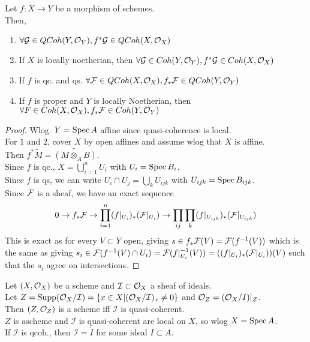 \documentclass[../main.tex]{subfiles}
\begin{document}
\begin{propo}
Let $f:X\to Y$ be a morphism of schemes.\\
Then,
\begin{enumerate}
\item $\forall \mathcal{G} \in QCoh( Y,\mathcal{O}_Y) , f^{\ast }\mathcal{G}\in QCoh( X,\mathcal{O}_X) $ 
\item If $X$ is locally noetherian, then  $\forall \mathcal{G} \in Coh( Y,\mathcal{O}_Y) , f^{\ast }\mathcal{G} \in Coh( X,\mathcal{O}_X) $
\item If $f$ is qc. and qs. $\forall \mathcal{F} \in QCoh( X,\mathcal{O}_X), f_\ast \mathcal{F} \in QCoh( Y,\mathcal{O}_Y) $ 
\item If $f$ is proper and $Y$ is locally Noetherian, then $\forall F\in Coh( X,\mathcal{O}_X), f_\ast \mathcal{F} \in Coh( Y,\mathcal{O}_Y) $ 
\end{enumerate}
\end{propo}
\begin{proof}
Wlog. $Y= \operatorname{Spec} A$ affine since quasi-coherence is local.\\
For 1 and 2, cover $X$ by open affines and assume wlog that $X$ is affine.\\
Then $f^{\ast} \widetilde{M} = \widetilde{( M\otimes_A B)}$.\\
Since $f$ is qc., $X= \bigcup_{i=1}^{n}U_i$ with $U_i = \operatorname{Spec} B_i$.\\
Since $f$ is qs, we can write $U_{i} \cap U_j= \bigcup_{k} U_{ij k} $ with $U_{ij k} = \operatorname{Spec} B_{ij k} $.\\
Since $\mathcal{F}$ is a sheaf, we have an exact sequence
\[ 
0\to f_\ast \mathcal{F} \to \prod_{i=1}^{n}( f|_{U_i} )_\ast ( \mathcal{F}|_{U_i} ) \to \prod_{ij} \prod_k ( f|_{U_{i j k} })_\ast ( \mathcal{F}|_{U_{i j k} } ) 
\]
This is exact as for every $V \subset Y$ open, giving $s\in f_\ast \mathcal{F}( V) = \mathcal{F}( f^{-1}( V) ) $ which is the same as giving $s_i \in \mathcal{F}( f^{-1}( V)\cap U_i ) = \mathcal{F}( f|_{U_i} ^{-1}( V) ) = (  ( f|_{U_i} )_\ast ( \mathcal{F}|_{U_i} ) ) ( V)  $ such that the $s_i$ agree on intersections.
\end{proof}
\begin{propo}
Let $( X,\mathcal{O}_X) $ be a scheme and $\mathcal{I} \subset \mathcal{O}_X$ a sheaf of ideals.\\
Let $Z= \operatorname{Supp}( \mathcal{O}_X /\mathcal{I}) = \left\{ x\in X | ( \mathcal{O}_X /\mathcal{I})_x \neq 0 \right\} $ and $\mathcal{O}_Z = ( \mathcal{O}_X /I) |_Z$.\\
Then $( Z,\mathcal{O}_Z) $ is a scheme iff $\mathcal{I}$ is quasi-coherent.\\
$Z$ is ascheme and $\mathcal{I}$ is quasi-coherent are local on $X$, so wlog $X= \operatorname{Spec} A$.\\
If $\mathcal{I}$ is qcoh., then $\mathcal{I}= \widetilde{I}$ for some ideal $I \subset A$.
\end{propo}



	
\end{document}
